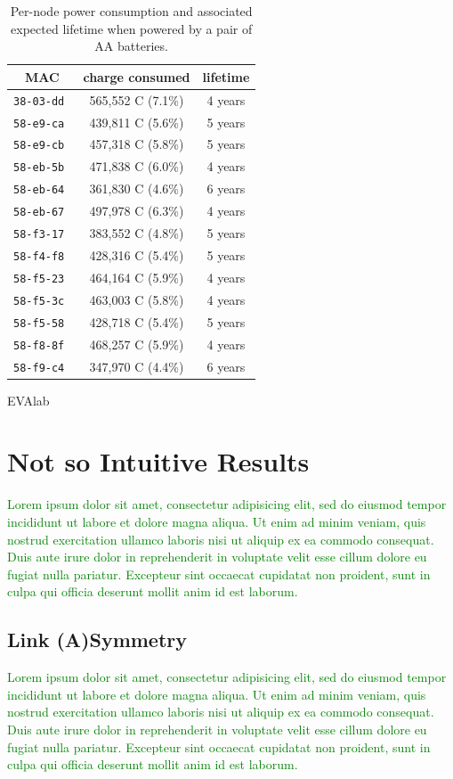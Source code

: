 \documentclass{elsarticle}
\newcommand{\lorem}          {\textcolor{green}{Lorem ipsum dolor sit amet, consectetur adipisicing elit, sed do eiusmod tempor incididunt ut labore et dolore magna aliqua. Ut enim ad minim veniam, quis nostrud exercitation ullamco laboris nisi ut aliquip ex ea commodo consequat. Duis aute irure dolor in reprehenderit in voluptate velit esse cillum dolore eu fugiat nulla pariatur. Excepteur sint occaecat cupidatat non proident, sunt in culpa qui officia deserunt mollit anim id est laborum.}}
\begin{document}
\begin{table}
\begin{subtable}{.45\textwidth}
\begin{tabular}{|c|c|c|}
    \toprule
    MAC &  charge consumed & lifetime \\
    \midrule
    \tt{38-03-dd} &  565,552 C (7.1\%)  &  4 years \\
    \tt{58-e9-ca} &  439,811 C (5.6\%)  &  5 years \\
    \tt{58-e9-cb} &  457,318 C (5.8\%)  &  5 years \\
    \tt{58-eb-5b} &  471,838 C (6.0\%)  &  4 years \\
    \tt{58-eb-64} &  361,830 C (4.6\%)  &  6 years \\
    \tt{58-eb-67} &  497,978 C (6.3\%)  &  4 years \\
    \tt{58-f3-17} &  383,552 C (4.8\%)  &  5 years \\
    \tt{58-f4-f8} &  428,316 C (5.4\%)  &  5 years \\
    \tt{58-f5-23} &  464,164 C (5.9\%)  &  4 years \\
    \tt{58-f5-3c} &  463,003 C (5.8\%)  &  4 years \\
    \tt{58-f5-58} &  428,718 C (5.4\%)  &  5 years \\
    \tt{58-f8-8f} &  468,257 C (5.9\%)  &  4 years \\
    \tt{58-f9-c4} &  347,970 C (4.4\%)  &  6 years \\
    \bottomrule
\end{tabular}
\caption{EVAlab}
\end{subtable}\hfill
\caption{Per-node power consumption and associated expected lifetime when powered by a pair of AA batteries.}
\label{tab:stats_charge}
\end{table}
\section{Not so Intuitive Results}
\label{sec:notsointuitive}

\lorem

\subsection{Link (A)Symmetry}
\label{sec:symmetry}


\lorem
\end{document}
